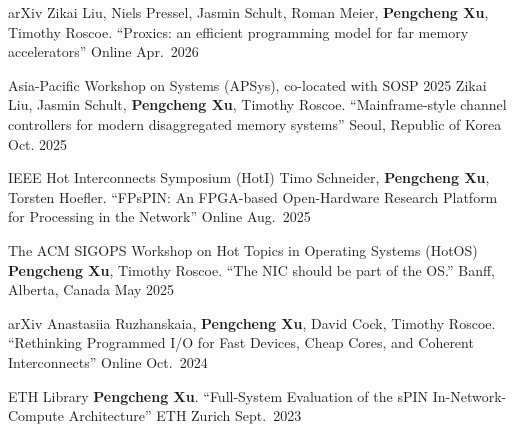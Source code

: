 


\begin{cventries}

  \cventry
    {arXiv}
    {{\normalfont Zikai Liu, Niels Pressel, Jasmin Schult, Roman Meier, \textbf{Pengcheng Xu}, Timothy Roscoe. ``Proxics: an efficient programming model for far memory accelerators''}}
    {Online} %
    {Apr.\ 2026} %
    {}

  \cventry
    {Asia-Pacific Workshop on Systems (APSys), co-located with SOSP 2025}
    {{\normalfont Zikai Liu, Jasmin Schult, \textbf{Pengcheng Xu}, Timothy Roscoe. ``Mainframe-style channel controllers for modern disaggregated memory systems''}}
    {Seoul, Republic of Korea} %
    {Oct. 2025} %
    {}

  \cventry
    {IEEE Hot Interconnects Symposium (HotI)}
    {{\normalfont Timo Schneider, \textbf{Pengcheng Xu}, Torsten Hoefler. ``FPsPIN: An FPGA-based Open-Hardware Research Platform for Processing in the Network''}}
    {Online} %
    {Aug.\ 2025} %
    {}

  \cventry
    {The ACM SIGOPS Workshop on Hot Topics in Operating Systems (HotOS)}
    {{\normalfont \textbf{Pengcheng Xu}, Timothy Roscoe. ``The NIC should be part of the OS.''}}
    {Banff, Alberta, Canada} %
    {May 2025} %
    {}

  \cventry
    {arXiv}
    {{\normalfont Anastasiia Ruzhanskaia, \textbf{Pengcheng Xu}, David Cock, Timothy Roscoe. ``Rethinking Programmed I/O for Fast Devices, Cheap Cores, and Coherent Interconnects''}}
    {Online} %
    {Oct.\ 2024} %
    {}

  \cventry
    {ETH Library}
    {{\normalfont \textbf{Pengcheng Xu}. ``Full-System Evaluation of the sPIN In-Network-Compute Architecture''}}
    {ETH Zurich} %
    {Sept.\ 2023} %
    {}


\end{cventries}

